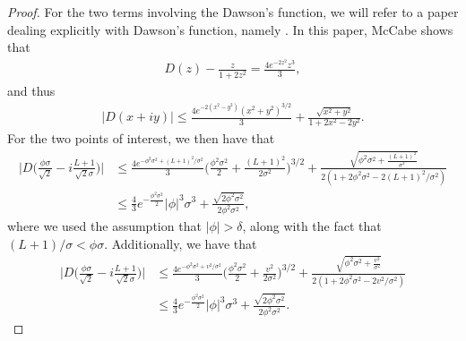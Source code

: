 \documentclass[../thesis-main/thesis-main]{subfiles}
\begin{document}
\begin{proof}
For the two terms involving the Dawson's function, we will refer to a paper dealing explicitly with Dawson's function, namely \cite{McC74}.  In this paper, McCabe shows that
\begin{align}
  D(z) - \frac{z}{1+2z^2} = \frac{4 e^{-2z^2}z^3}{3},
\end{align}
and thus
\begin{align}
  \big| D(x+iy)\big| \leq \frac{4 e^{-2(x^2 - y^2)} (x^2+y^2)^{3/2}}{3} + \frac{\sqrt{x^2+y^2}}{1 + 2 x^2 - 2 y^2}.
\end{align}
For the two points of interest, we then have that
\begin{align}
  \bigg|D\bigg(\frac{\phi \sigma}{\sqrt{2}} - i \frac{L+1}{\sqrt{2}\sigma}\bigg)\bigg| &
  \leq \frac{ 4 e^{- \phi^2\sigma^2 + (L+1)^2/\sigma^2}}{3} \bigg(\frac{\phi^2\sigma^2}{2} + \frac{(L+1)^2}{2\sigma^2} \bigg)^{3/2} + \frac{ \sqrt{\phi^2 \sigma^2 + \frac{(L+1)^2}{\sigma^2}}}{2(1 + 2\phi^2 \sigma^2 - 2(L+1)^2/\sigma^2)}\\
  &\leq \frac{4}{3} e^{-\frac{\phi^2\sigma^2}{2}} |\phi|^3 \sigma^3 + \frac{\sqrt{2 \phi^2\sigma^2}}{2 \phi^2\sigma^2},
\end{align}
where we used the assumption that $|\phi| >\delta$, along with the fact that $(L+1)/\sigma < \phi \sigma$.  Additionally, we have that
\begin{align}
  \bigg|D\bigg(\frac{\phi \sigma}{\sqrt{2}} - i \frac{L+1}{\sqrt{2}\sigma}\bigg)\bigg| &
    \leq \frac{ 4 e^{- \phi^2\sigma^2 + v^2/\sigma^2}}{3} \bigg(\frac{\phi^2\sigma^2}{2} + \frac{v^2}{2\sigma^2} \bigg)^{3/2} + \frac{ \sqrt{\phi^2 \sigma^2 + \frac{v^2}{\sigma^2}}}{2(1 + 2\phi^2 \sigma^2 - 2v^2/\sigma^2)}\\
    &\leq \frac{4}{3} e^{-\frac{\phi^2\sigma^2}{2}} |\phi|^3 \sigma^3 + \frac{\sqrt{2 \phi^2\sigma^2}}{2 \phi^2\sigma^2}.
\end{align}


\end{proof}
\end{document}
